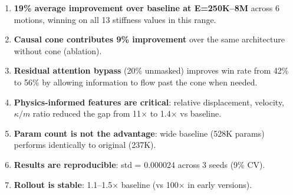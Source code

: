 \documentclass[10pt]{article}
\begin{document}
\begin{enumerate}
\item \textbf{19\% average improvement over baseline at E=250K--8M} across 6 motions, winning on all 13 stiffness values in this range.

\item \textbf{Causal cone contributes 9\% improvement} over the same architecture without cone (ablation).

\item \textbf{Residual attention bypass} (20\% unmasked) improves win rate from 42\% to 56\% by allowing information to flow past the cone when needed.

\item \textbf{Physics-informed features are critical}: relative displacement, velocity, $\kappa/m$ ratio reduced the gap from 11$\times$ to 1.4$\times$ vs baseline.

\item \textbf{Param count is not the advantage}: wide baseline (528K params) performs identically to original (237K).

\item \textbf{Results are reproducible}: std = 0.000024 across 3 seeds (9\% CV).

\item \textbf{Rollout is stable}: 1.1--1.5$\times$ baseline (vs 100$\times$ in early versions).
\end{enumerate}
\end{document}

